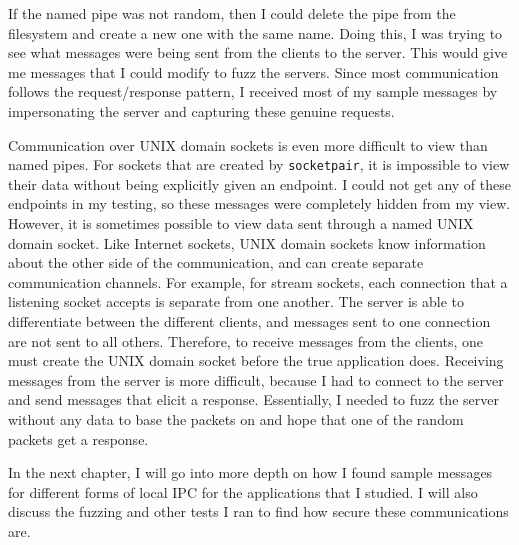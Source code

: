 If the named pipe was not random, then I could delete the pipe from the filesystem and create a new one with the same name.  Doing this, I was trying to see what messages were being sent from the clients to the server.  This would give me messages that I could modify to fuzz the servers.  Since most communication follows the request/response pattern, I received most of my sample messages by impersonating the server and capturing these genuine requests.

Communication over UNIX domain sockets is even more difficult to view than named pipes.  For sockets that are created by \texttt{socketpair}, it is impossible to view their data without being explicitly given an endpoint.  I could not get any of these endpoints in my testing, so these messages were completely hidden from my view.  However, it is sometimes possible to view data sent through a named UNIX domain socket.  Like Internet sockets, UNIX domain sockets know information about the other side of the communication, and can create separate communication channels.  For example, for stream sockets, each connection that a listening socket accepts is separate from one another.  The server is able to differentiate between the different clients, and messages sent to one connection are not sent to all others.  Therefore, to receive messages from the clients, one must create the UNIX domain socket before the true application does.  Receiving messages from the server is more difficult, because I had to connect to the server and send messages that elicit a response.  Essentially, I needed to fuzz the server without any data to base the packets on and hope that one of the random packets get a response.

In the next chapter, I will go into more depth on how I found sample messages for different forms of local IPC for the applications that I studied.  I will also discuss the fuzzing and other tests I ran to find how secure these communications are.
